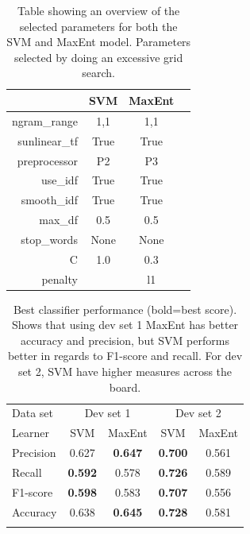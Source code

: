 \begin{table}[!htb]
\centering
\begin{tabular}{|r||c|c|c|} 
\cline{2-3}
\multicolumn{1}{c|}{ } & \textbf{SVM} & \textbf{MaxEnt} \\ \hline
ngram\_range & 1,1 & 1,1 \\ \hline
sunlinear\_tf  & True & True \\ \hline
preprocessor & P2 & P3 \\ \hline
use\_idf & True & True \\ \hline
smooth\_idf & True & True \\ \hline
max\_df & 0.5 & 0.5 \\ \hline
stop\_words & None & None \\ \hline
C & 1.0 & 0.3 \\ \hline
penalty &  & l1 \\ \hline

\end{tabular}
\caption{Table showing an overview of the selected parameters for both the SVM and MaxEnt model. Parameters selected by doing an excessive grid search.}
\label{tab:svm_maxent_best_params}
\end{table}


\begin{table}[!htb]
	\centering
	\begin{tabular}{l|cc|cc} 
	\noalign{\smallskip}\hline\noalign{\smallskip}
	Data set & \multicolumn{2}{c|}{Dev set 1} & \multicolumn{2}{c}{Dev set 2} \\
	Learner  & SVM    & MaxEnt & SVM    & MaxEnt \\
	\noalign{\smallskip}\hline\noalign{\smallskip}
	Precision  & 0.627  & {\bf 0.647}   & {\bf 0.700}  & 0.561 \\
	Recall       & {\bf 0.592}  & 0.578  & {\bf 0.726}  & 0.589 \\
	F1-score  & {\bf 0.598}  & 0.583  & {\bf 0.707}  & 0.556 \\
	Accuracy & 0.638  & {\bf 0.645}  & {\bf 0.728}  & 0.581 \\
	\noalign{\smallskip}\hline\noalign{\smallskip}
	\end{tabular}
	\caption{Best classifier performance {\small (bold=best score)}. Shows that using dev set 1 MaxEnt has better accuracy and precision, but SVM performs better in regards to F1-score and recall. For dev set 2, SVM have higher measures across the board.}
	\label{tab:performance}
\end{table}


